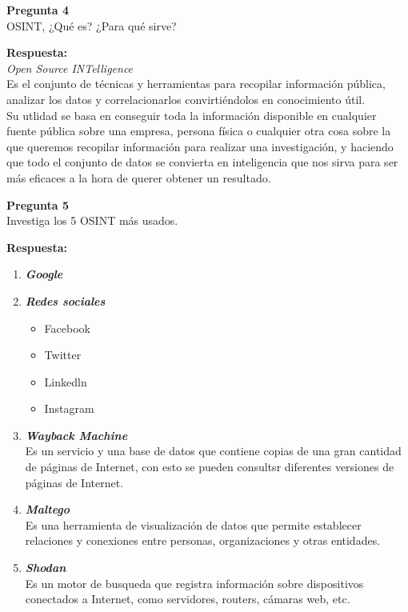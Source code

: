 \documentclass{article}
\newenvironment{problem}[2][Pregunta]
    { \begin{mdframed}[backgroundcolor=gray!20] \textbf{#1 #2} \\}
    {  \end{mdframed}}
\newenvironment{solution}
    {\textbf{Respuesta:\\}}
    {}
\begin{document}
\begin{problem}
    {4} OSINT, ¿Qué es? ¿Para qué sirve?
\end{problem}
\begin{solution}
\textit{Open Source INTelligence}\\

Es el conjunto de técnicas y herramientas para recopilar información pública, analizar los datos y correlacionarlos convirtiéndolos en conocimiento útil.\\

Su utlidad se basa en conseguir toda la información disponible en cualquier fuente pública sobre una empresa, persona física o cualquier otra cosa sobre la que queremos recopilar información para realizar una investigación, y haciendo que todo el conjunto de datos se convierta en inteligencia que nos sirva para ser más eficaces a la hora de querer obtener un resultado.
\end{solution}
\begin{problem}
    {5} Investiga los 5 OSINT más usados.
\end{problem}

\begin{solution}
    \begin{enumerate}
        \item \textbf{\textit{Google}}
        \item \textbf{\textit{Redes sociales}}
        \begin{itemize}
            \item Facebook
            \item Twitter
            \item Linkedln
            \item Instagram
        \end{itemize}
        \item \textbf{\textit{Wayback Machine}}\\
         Es un servicio y una base de datos que contiene copias de una gran cantidad de páginas de Internet, con esto se pueden consultsr diferentes versiones de páginas de Internet.

         \item \textbf{\textit{Maltego}}\\
         Es una herramienta de visualización de datos que permite establecer relaciones y conexiones entre personas, organizaciones y otras entidades.

         \item \textbf{\textit{Shodan}}\\
         Es un motor de busqueda que registra información sobre dispositivos conectados a Internet, como servidores, routers, cámaras web, etc.
    \end{enumerate}
\end{solution}
\end{document}
